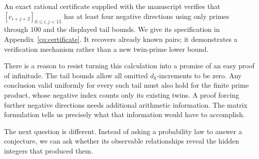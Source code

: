 An exact rational certificate supplied with the manuscript verifies that
\([c_{i+j+2}]_{0\leq i,j<15}\) has at least four negative directions using
only primes through \(100\) and the displayed tail bounds. We give its
specification in Appendix~\ref{cq:certificate}. It recovers already known
pairs; it demonstrates a verification mechanism rather than a new
twin-prime lower bound.

There is a reason to resist turning this calculation into a promise of an
easy proof of infinitude. The tail bounds allow all omitted \(d_k\)-increments
to be zero. Any conclusion valid uniformly for every such tail must also
hold for the finite prime product, whose negative index counts only its
existing twins. A proof forcing further negative directions needs additional
arithmetic information. The matrix formulation tells us precisely what that
information would have to accomplish.

The next question is different. Instead of asking a probability law to
answer a conjecture, we can ask whether its observable relationships reveal
the hidden integers that produced them.
